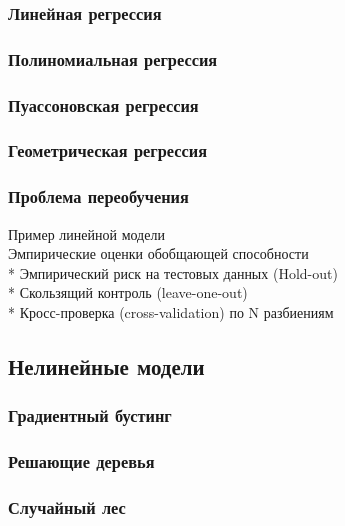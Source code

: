 \subsubsection{Линейная регрессия}

\subsubsection{Полиномиальная регрессия}

\subsubsection{Пуассоновская регрессия}

\subsubsection{Геометрическая регрессия}

\subsubsection{Проблема переобучения}

Пример линейной модели\\

Эмпирические оценки обобщающей способности\\
* Эмпирический риск на тестовых данных (Hold-out)\\
* Скользящий контроль (leave-one-out)\\
* Кросс-проверка (cross-validation) по N разбиениям\\

\subsection{Нелинейные модели}

\subsubsection{Градиентный бустинг}

\subsubsection{Решающие деревья}

\subsubsection{Случайный лес}
